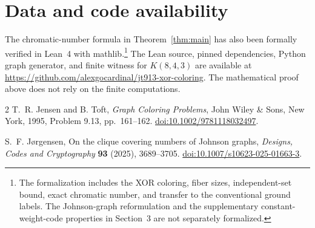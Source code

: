 \documentclass[11pt]{article}
\begin{document}
\section*{Data and code availability}
The chromatic-number formula in Theorem~\ref{thm:main} has also been
formally verified in Lean~4 with mathlib.\footnote{The formalization
includes the XOR coloring, fiber sizes, independent-set bound, exact
chromatic number, and transfer to the conventional ground labels.
The Johnson-graph reformulation and the supplementary constant-weight-code
properties in Section~3 are not separately formalized.}
The Lean source, pinned dependencies, Python graph generator, and finite
witness for $K(8,4,3)$ are available at
\url{https://github.com/alexgocardinal/jt913-xor-coloring}.
The mathematical proof above does not rely on the finite computations.

\begin{thebibliography}{2}
T.~R. Jensen and B. Toft,
\emph{Graph Coloring Problems},
John Wiley \& Sons, New York, 1995, Problem 9.13, pp.~161--162.
\href{https://doi.org/10.1002/9781118032497}{doi:10.1002/9781118032497}.

S.~F. J\o rgensen,
On the clique covering numbers of Johnson graphs,
\emph{Designs, Codes and Cryptography} \textbf{93} (2025), 3689--3705.
\href{https://doi.org/10.1007/s10623-025-01663-3}{doi:10.1007/s10623-025-01663-3}.
\end{thebibliography}
\end{document}
